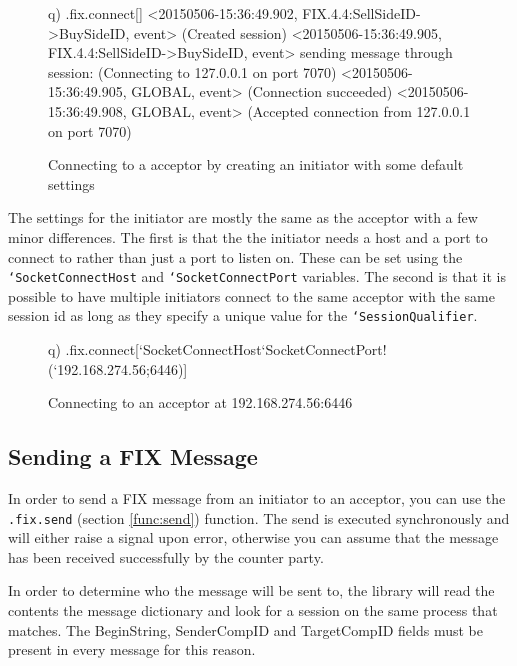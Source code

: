 \begin{figure}[H]
\begin{qcode}
q) .fix.connect[]
<20150506-15:36:49.902, FIX.4.4:SellSideID->BuySideID, event>
(Created session)
<20150506-15:36:49.905, FIX.4.4:SellSideID->BuySideID, event>
sending message through session:   (Connecting to 127.0.0.1 on port 7070)
<20150506-15:36:49.905, GLOBAL, event>
(Connection succeeded)
<20150506-15:36:49.908, GLOBAL, event>
(Accepted connection from 127.0.0.1 on port 7070)
\end{qcode}
\caption{Connecting to a acceptor by creating an initiator with some default settings}
\end{figure}

The settings for the initiator are mostly the same as the acceptor with a few minor differences. The first is that the the initiator needs a host and a port to connect to rather than just a port to listen on. These can be set using the \texttt{`SocketConnectHost} and \texttt{`SocketConnectPort} variables. The second is that it is possible to have multiple initiators connect to the same acceptor with the same session id as long as they specify a unique
value for the \texttt{`SessionQualifier}.

\begin{figure}[H]
\begin{qcode}
q) .fix.connect[`SocketConnectHost`SocketConnectPort!(`192.168.274.56;6446)]
\end{qcode}
\caption{Connecting to an acceptor at 192.168.274.56:6446}
\end{figure}

\subsection{Sending a FIX Message}
In order to send a FIX message from an initiator to an acceptor, you can use the \texttt{.fix.send} (section \ref{func:send}) function. The send is executed
synchronously and will either raise a signal upon error, otherwise you can assume that
the message has been received successfully by the counter party. 

In order to determine who the message will be sent to, the library will read the contents
the message dictionary and look for a session on the same process that matches. The BeginString,
SenderCompID and TargetCompID fields must be present in every message for this reason.

